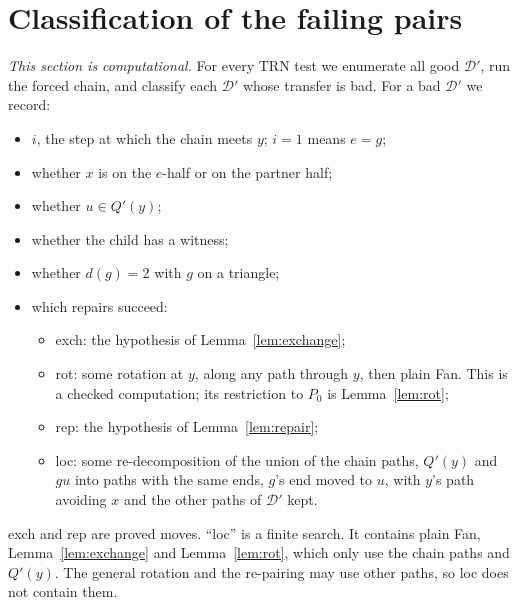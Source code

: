 \documentclass[11pt]{amsart}
\theoremstyle{definition}
\newcommand{\cD}{\mathcal D}
\newcommand{\TRN}{\mathrm{TRN}}
\begin{document}
\section{Classification of the failing pairs}\label{sec:class}

\emph{This section is computational.} For every $\TRN$ test we enumerate all good $\cD'$, run the
forced chain, and classify each $\cD'$ whose transfer is bad. For a bad $\cD'$ we record:
\begin{itemize}
\item $i$, the step at which the chain meets $y$; $i=1$ means $e=g$;
\item whether $x$ is on the $e$-half or on the partner half;
\item whether $u\in Q'(y)$;
\item whether the child has a witness;
\item whether $d(g)=2$ with $g$ on a triangle;
\item which repairs succeed:
  \begin{itemize}
  \item exch: the hypothesis of Lemma~\ref{lem:exchange};
  \item rot: some rotation at $y$, along any path through $y$, then plain Fan. This is a checked
  computation; its restriction to $P_0$ is Lemma~\ref{lem:rot};
  \item rep: the hypothesis of Lemma~\ref{lem:repair};
  \item loc: some re-decomposition of the union of the chain paths, $Q'(y)$ and $gu$ into paths
  with the same ends, $g$'s end moved to $u$, with $y$'s path avoiding $x$ and the other paths
  of $\cD'$ kept.
  \end{itemize}
\end{itemize}
exch and rep are proved moves. ``loc'' is a finite search. It contains plain Fan,
Lemma~\ref{lem:exchange} and Lemma~\ref{lem:rot}, which only use the chain paths and $Q'(y)$. The
general rotation and the re-pairing may use other paths, so loc does not contain them.
\end{document}
